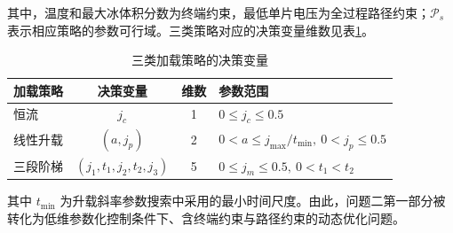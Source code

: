 \documentclass[bwprint]{gmcmthesis}
\numberwithin{figure}{section}
\begin{document}
\noindent 其中，温度和最大冰体积分数为终端约束，最低单片电压为全过程路径约束；\(\mathcal{P}_s\) 表示相应策略的参数可行域。三类策略对应的决策变量维数见表\ref{B90}。


\begin{table}[htbp]
    \centering
    \caption{三类加载策略的决策变量}
        \vspace{0.3cm}
        \label{B90}
    \renewcommand{\arraystretch}{1.5} %
    \begin{tabular}{l c c l}
        \toprule
        加载策略 & 决策变量 & 维数 & 参数范围 \\
        \midrule
        恒流 & \(j_c\) & 1 & \(0 \leq j_c \leq 0.5\) \\
        线性升载 & \((a, j_p)\) & 2 & \(0 < a \leq j_{\text{max}}/t_{\text{min}}, \ 0 < j_p \leq 0.5\) \\
        三段阶梯 & \((j_1, t_1, j_2, t_2, j_3)\) & 5 & \(0 \leq j_m \leq 0.5, \ 0 < t_1 < t_2\) \\
        \bottomrule
    \end{tabular}
\end{table}

其中 \(t_{\min}\) 为升载斜率参数搜索中采用的最小时间尺度。由此，问题二第一部分被转化为低维参数化控制条件下、含终端约束与路径约束的动态优化问题。
\end{document}
